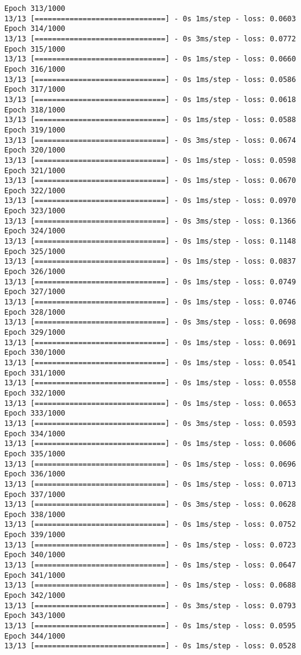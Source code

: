 \documentclass[11pt]{article}
\begin{document}
\begin{Verbatim}[commandchars=\\\{\}]
Epoch 313/1000
13/13 [==============================] - 0s 1ms/step - loss: 0.0603
Epoch 314/1000
13/13 [==============================] - 0s 3ms/step - loss: 0.0772
Epoch 315/1000
13/13 [==============================] - 0s 1ms/step - loss: 0.0660
Epoch 316/1000
13/13 [==============================] - 0s 1ms/step - loss: 0.0586
Epoch 317/1000
13/13 [==============================] - 0s 1ms/step - loss: 0.0618
Epoch 318/1000
13/13 [==============================] - 0s 1ms/step - loss: 0.0588
Epoch 319/1000
13/13 [==============================] - 0s 3ms/step - loss: 0.0674
Epoch 320/1000
13/13 [==============================] - 0s 1ms/step - loss: 0.0598
Epoch 321/1000
13/13 [==============================] - 0s 1ms/step - loss: 0.0670
Epoch 322/1000
13/13 [==============================] - 0s 1ms/step - loss: 0.0970
Epoch 323/1000
13/13 [==============================] - 0s 3ms/step - loss: 0.1366
Epoch 324/1000
13/13 [==============================] - 0s 1ms/step - loss: 0.1148
Epoch 325/1000
13/13 [==============================] - 0s 1ms/step - loss: 0.0837
Epoch 326/1000
13/13 [==============================] - 0s 1ms/step - loss: 0.0749
Epoch 327/1000
13/13 [==============================] - 0s 1ms/step - loss: 0.0746
Epoch 328/1000
13/13 [==============================] - 0s 3ms/step - loss: 0.0698
Epoch 329/1000
13/13 [==============================] - 0s 1ms/step - loss: 0.0691
Epoch 330/1000
13/13 [==============================] - 0s 1ms/step - loss: 0.0541
Epoch 331/1000
13/13 [==============================] - 0s 1ms/step - loss: 0.0558
Epoch 332/1000
13/13 [==============================] - 0s 1ms/step - loss: 0.0653
Epoch 333/1000
13/13 [==============================] - 0s 3ms/step - loss: 0.0593
Epoch 334/1000
13/13 [==============================] - 0s 1ms/step - loss: 0.0606
Epoch 335/1000
13/13 [==============================] - 0s 1ms/step - loss: 0.0696
Epoch 336/1000
13/13 [==============================] - 0s 1ms/step - loss: 0.0713
Epoch 337/1000
13/13 [==============================] - 0s 3ms/step - loss: 0.0628
Epoch 338/1000
13/13 [==============================] - 0s 1ms/step - loss: 0.0752
Epoch 339/1000
13/13 [==============================] - 0s 1ms/step - loss: 0.0723
Epoch 340/1000
13/13 [==============================] - 0s 1ms/step - loss: 0.0647
Epoch 341/1000
13/13 [==============================] - 0s 1ms/step - loss: 0.0688
Epoch 342/1000
13/13 [==============================] - 0s 3ms/step - loss: 0.0793
Epoch 343/1000
13/13 [==============================] - 0s 1ms/step - loss: 0.0595
Epoch 344/1000
13/13 [==============================] - 0s 1ms/step - loss: 0.0528

\end{Verbatim}
\end{document}
